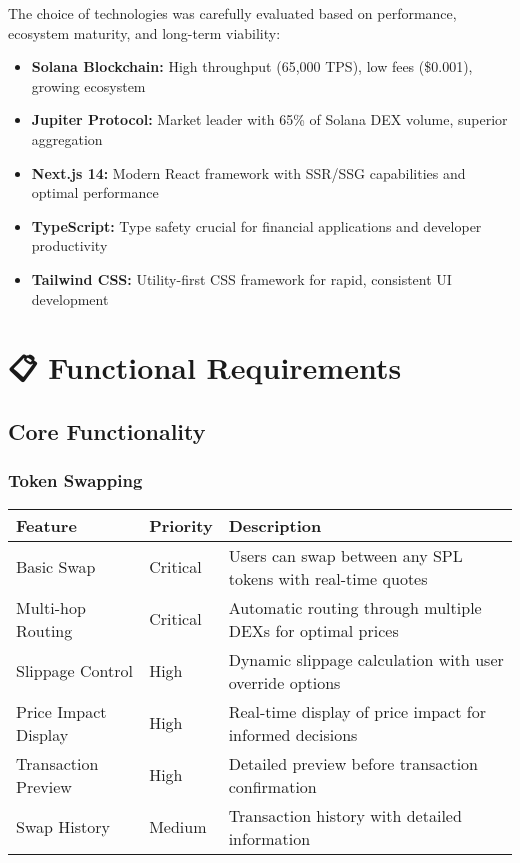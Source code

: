 \documentclass[12pt,a4paper]{article}
\begin{document}
The choice of technologies was carefully evaluated based on performance, ecosystem maturity, and long-term viability:

\begin{itemize}
    \item \textbf{Solana Blockchain:} High throughput (65,000 TPS), low fees (\$0.001), growing ecosystem
    \item \textbf{Jupiter Protocol:} Market leader with 65\% of Solana DEX volume, superior aggregation
    \item \textbf{Next.js 14:} Modern React framework with SSR/SSG capabilities and optimal performance
    \item \textbf{TypeScript:} Type safety crucial for financial applications and developer productivity
    \item \textbf{Tailwind CSS:} Utility-first CSS framework for rapid, consistent UI development
\end{itemize}

\section{📋 Functional Requirements}

\subsection{Core Functionality}

\subsubsection{Token Swapping}

\begin{longtable}{|p{3cm}|p{4cm}|p{6cm}|}
\hline
\textbf{Feature} & \textbf{Priority} & \textbf{Description} \\
\hline
\endhead

Basic Swap & Critical & Users can swap between any SPL tokens with real-time quotes \\
\hline
Multi-hop Routing & Critical & Automatic routing through multiple DEXs for optimal prices \\
\hline
Slippage Control & High & Dynamic slippage calculation with user override options \\
\hline
Price Impact Display & High & Real-time display of price impact for informed decisions \\
\hline
Transaction Preview & High & Detailed preview before transaction confirmation \\
\hline
Swap History & Medium & Transaction history with detailed information \\
\hline
\end{longtable}
\end{document}
